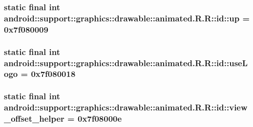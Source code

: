 \hypertarget{classandroid_1_1support_1_1graphics_1_1drawable_1_1animated_1_1_r_1_1id_8f01e0f8dedf256216bf36672b4acf97}{
\subsubsection[{up}]{\setlength{\rightskip}{0pt plus 5cm}static final int android::support::graphics::drawable::animated.R.R::id::up = 0x7f080009}}
\label{classandroid_1_1support_1_1graphics_1_1drawable_1_1animated_1_1_r_1_1id_8f01e0f8dedf256216bf36672b4acf97}


\hypertarget{classandroid_1_1support_1_1graphics_1_1drawable_1_1animated_1_1_r_1_1id_2d28196dc171ff6be5109e0e97e470df}{
\subsubsection[{useLogo}]{\setlength{\rightskip}{0pt plus 5cm}static final int android::support::graphics::drawable::animated.R.R::id::useLogo = 0x7f080018}}
\label{classandroid_1_1support_1_1graphics_1_1drawable_1_1animated_1_1_r_1_1id_2d28196dc171ff6be5109e0e97e470df}


\hypertarget{classandroid_1_1support_1_1graphics_1_1drawable_1_1animated_1_1_r_1_1id_f641a40c289206d49ddf44e594d8c82e}{
\subsubsection[{view\_\-offset\_\-helper}]{\setlength{\rightskip}{0pt plus 5cm}static final int android::support::graphics::drawable::animated.R.R::id::view\_\-offset\_\-helper = 0x7f08000e}}
\label{classandroid_1_1support_1_1graphics_1_1drawable_1_1animated_1_1_r_1_1id_f641a40c289206d49ddf44e594d8c82e}


